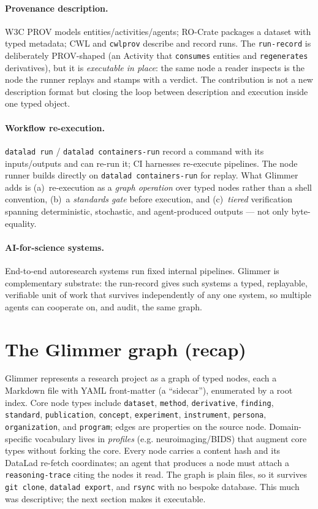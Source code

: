 \documentclass[preprint]{glimmer-paper}
\newcommand{\code}[1]{\texttt{#1}}
\begin{document}
\paragraph{Provenance description.} W3C PROV \citep{provdm2013} models
entities/activities/agents; RO-Crate \citep{soilandreyes2022rocrate} packages a dataset with
typed metadata; CWL and \code{cwlprov} \citep{crusoe2022cwl} describe and record runs. The
\code{run-record} is deliberately PROV-shaped (an Activity that \code{consumes} entities and
\code{regenerates} derivatives), but it is \emph{executable in place}: the same node a reader
inspects is the node the runner replays and stamps with a verdict. The contribution is not a
new description format but closing the loop between description and execution inside one
typed object.

\paragraph{Workflow re-execution.} \code{datalad run} / \code{datalad containers-run} record
a command with its inputs/outputs and can re-run it; CI harnesses re-execute pipelines. The
node runner builds directly on \code{datalad containers-run} for replay. What Glimmer adds is
(a)~re-execution as a \emph{graph operation} over typed nodes rather than a shell convention,
(b)~a \emph{standards gate} before execution, and (c)~\emph{tiered} verification spanning
deterministic, stochastic, and agent-produced outputs --- not only byte-equality.

\paragraph{AI-for-science systems.} End-to-end autoresearch systems
\citep{lu2024aiscientist} run fixed internal pipelines. Glimmer is complementary substrate:
the run-record gives such systems a typed, replayable, verifiable unit of work that survives
independently of any one system, so multiple agents can cooperate on, and audit, the same
graph.

\section{The Glimmer graph (recap)}

Glimmer represents a research project as a graph of typed nodes, each a Markdown file with
YAML front-matter (a ``sidecar''), enumerated by a root index. Core node types include
\code{dataset}, \code{method}, \code{derivative}, \code{finding}, \code{standard},
\code{publication}, \code{concept}, \code{experiment}, \code{instrument}, \code{persona},
\code{organization}, and \code{program}; edges are properties on the source node.
Domain-specific vocabulary lives in \emph{profiles} (e.g. neuroimaging/BIDS) that augment
core types without forking the core. Every node carries a content hash and its DataLad
re-fetch coordinates; an agent that produces a node must attach a \code{reasoning-trace}
citing the nodes it read. The graph is plain files, so it survives \code{git clone},
\code{datalad export}, and \code{rsync} with no bespoke database. This much was descriptive;
the next section makes it executable.
\end{document}
